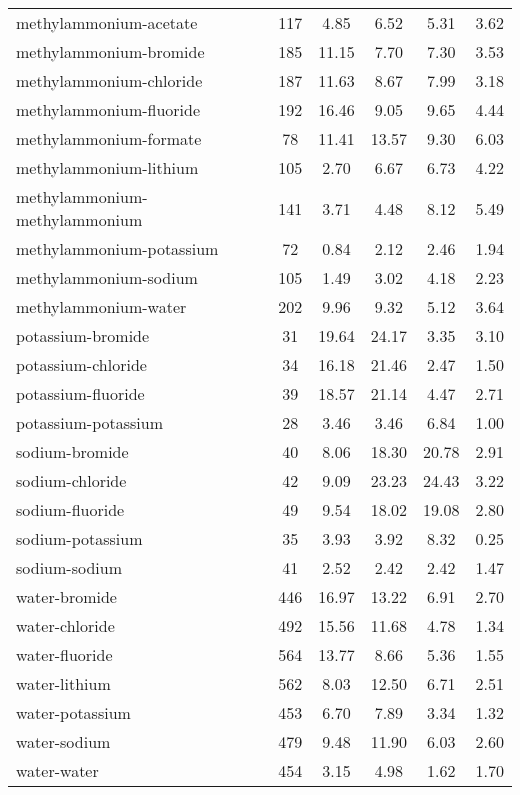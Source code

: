 \begin{longtable}{lccccc}
methylammonium-acetate & 117  & 4.85 & 6.52 & 5.31 & 3.62\\
methylammonium-bromide & 185  & 11.15 & 7.70 & 7.30 & 3.53\\
methylammonium-chloride & 187  & 11.63 & 8.67 & 7.99 & 3.18\\
methylammonium-fluoride & 192  & 16.46 & 9.05 & 9.65 & 4.44\\
methylammonium-formate & 78  & 11.41 & 13.57 & 9.30 & 6.03\\
methylammonium-lithium & 105  & 2.70 & 6.67 & 6.73 & 4.22\\
methylammonium-methylammonium & 141  & 3.71 & 4.48 & 8.12 & 5.49\\
methylammonium-potassium & 72  & 0.84 & 2.12 & 2.46 & 1.94\\
methylammonium-sodium & 105  & 1.49 & 3.02 & 4.18 & 2.23\\
methylammonium-water & 202  & 9.96 & 9.32 & 5.12 & 3.64\\
potassium-bromide & 31  & 19.64 & 24.17 & 3.35 & 3.10\\
potassium-chloride & 34  & 16.18 & 21.46 & 2.47 & 1.50\\
potassium-fluoride & 39  & 18.57 & 21.14 & 4.47 & 2.71\\
potassium-potassium & 28  & 3.46 & 3.46 & 6.84 & 1.00\\
sodium-bromide & 40  & 8.06 & 18.30 & 20.78 & 2.91\\
sodium-chloride & 42  & 9.09 & 23.23 & 24.43 & 3.22\\
sodium-fluoride & 49  & 9.54 & 18.02 & 19.08 & 2.80\\
sodium-potassium & 35  & 3.93 & 3.92 & 8.32 & 0.25\\
sodium-sodium & 41  & 2.52 & 2.42 & 2.42 & 1.47\\
water-bromide & 446  & 16.97 & 13.22 & 6.91 & 2.70\\
water-chloride & 492  & 15.56 & 11.68 & 4.78 & 1.34\\
water-fluoride & 564  & 13.77 & 8.66 & 5.36 & 1.55\\
water-lithium & 562  & 8.03 & 12.50 & 6.71 & 2.51\\
water-potassium & 453  & 6.70 & 7.89 & 3.34 & 1.32\\
water-sodium & 479  & 9.48 & 11.90 & 6.03 & 2.60\\
water-water & 454  & 3.15 & 4.98 & 1.62 & 1.70\\
\hline
\end{longtable}
